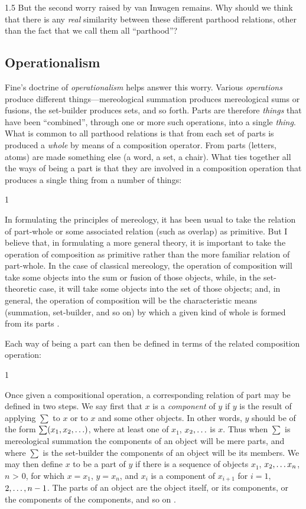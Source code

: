 \documentclass[11pt]{article}
\newenvironment{squote}{%
\begin{spacing}{1}
\begin{list}{}{%
\setlength{\labelwidth}{0pt}%
\rightmargin\leftmargin%
}
\item\relax
}{%
\end{list}%
\end{spacing}
}
\begin{document}
\begin{spacing}{1.5}
But the second worry raised by van Inwagen remains.  Why should we
think that there is any {\em real} similarity between these different
parthood relations, other than the fact that we call them all
``parthood''?

\subsection{Operationalism}
\label{operation}
Fine's doctrine of {\em operationalism} helps answer this worry.
Various {\em operations} produce different things---mereological
summation produces mereological sums or fusions, the set-builder
produces sets, and so forth.  Parts are therefore {\em things} that
have been ``combined'', through one or more such operations, into a
single {\em thing}.  What is common to all parthood relations is that
from each set of parts is produced a {\em whole} by means of a
composition operator.  From parts (letters, atoms) are made something
else (a word, a set, a chair).  What ties together all the ways of
being a part is that they are involved in a composition operation that
produces a single thing from a number of things:

\begin{squote}
In formulating the principles of mereology, it has been usual to take
the relation of part-whole or some associated relation (such as
overlap) as primitive.  But I believe that, in formulating a more
general theory, it is important to take the operation of composition
as primitive rather than the more familiar relation of part-whole.  In
the case of classical mereology, the operation of composition will
take some objects into the sum or fusion of those objects, while, in
the set-theoretic case, it will take some objects into the set of
those objects; and, in general, the operation of composition will be
the characteristic means (summation, set-builder, and so on) by which
a given kind of whole is formed from its parts \citep[565]{fine2010}.
\end{squote}

Each way of being a part can then be defined in terms of the related
composition operation:

\begin{squote}
Once given a compositional operation, a corresponding relation of part
may be defined in two steps.  We say first that $x$ is a {\em
  component} of $y$ if $y$ is the result of applying $\sum$ to $x$ or
to $x$ and some other objects.  In other words, $y$ should be of the
form $\sum (x_{1}, x_{2}, \mathellipsis )$, where at least one of
$x_1$, $x_2, \mathellipsis$ is $x$.  Thus when $\sum$ is mereological
summation the components of an object will be mere parts, and where
$\sum$ is the set-builder the components of an object will be its
members.  We may then define $x$ to be a part of $y$ if there is a
sequence of objects $x_1$, $x_2, \mathellipsis x_n$, $n$
\textgreater{} $0$, for which $x = x_1$, $y = x_n$, and $x_i$ is a
component of $x_{i+1}$ for $i = 1$, $2, \mathellipsis, n-1$. The parts
of an object are the object itself, or its components, or the
components of the components, and so on \citep[567--568]{fine2010}.
\end{squote}


\end{spacing}
\end{document}

